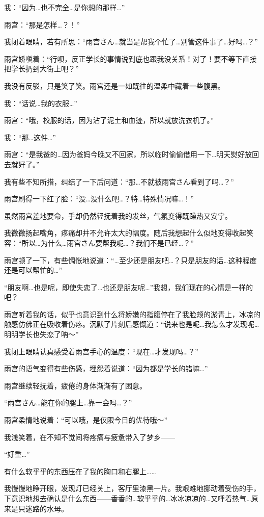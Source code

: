我：“因为…也不完全…是你想的那样…”

雨宫：“那是怎样…？！”

我闭着眼睛，若有所思：“雨宫さん…就当是帮我个忙了…别管这件事了…好吗…？”

雨宫娇嗔着：“行呗，反正学长的事情说到底也跟我没关系！对了！要不等下直接把学长扔到大街上吧？”

我没有反驳，只是笑了笑。雨宫还是一如既往的温柔中藏着一些腹黑。

我：“话说…我的衣服…”

雨宫：“哦，校服的话，因为沾了泥土和血迹，所以就放洗衣机了。”

我：“那…这件…”

雨宫：“是我爸的…因为爸妈今晚又不回家，所以临时偷偷借用一下…明天熨好放回去就好了。”

我有些不知所措，纠结了一下后问道：“那…不就被雨宫さん看到了吗…？”

雨宫刷得一下红了脸：“没…没什么吧…？特…特殊情况嘛…！”

虽然雨宫羞地要命，手却仍然轻抚着我的发丝，气氛变得既躁热又安宁。

我微微扬起嘴角，疼痛却并不允许太大的幅度。随后我想起什么似地变得收起笑容：“所以…为什么…雨宫さん要帮我呢…？我们不是已经…？”

雨宫顿了一下，有些惆怅地说道：“…至少还是朋友吧…？只是朋友的话…这种程度还是可以帮忙的…”

“朋友啊…也是呢，即使失恋了…也还是朋友呢…”我想，我们现在的心情是一样的吧？

雨宫听着我的话，似乎也意识到什么将娇嫩的指腹停在了我脸颊的淤青上，冰凉的触感仿佛正在吸收着伤疼。沉默了片刻后感慨道：“说来也是呢…我怎么才发现呢…明明学长也失恋了呐～”

我闭上眼睛认真感受着雨宫手心的温度：“现在…才发现吗…？”

雨宫的语气变得有些伤感，埋怨着说道：“因为都是学长的错嘛…”

雨宫继续轻抚着，疲倦的身体渐渐有了困意。

“雨宫さん…能在你的腿上…靠一会吗…？”

雨宫柔情地说着：“可以哦，是仅限今日的优待哦～”

我浅笑着，在不知不觉间将疼痛与疲惫带入了梦乡——

\cutlinef\zzz

“好重…”

有什么软乎乎的东西压在了我的胸口和右腿上……

我慢慢地睁开眼，发现灯已经关上，客厅里漆黑一片。我艰难地挪动着受伤的手，下意识地想去确认是什么东西——香香的…软乎乎的…冰冰凉凉的…又呼着热气…原来是只迷路的水母。

